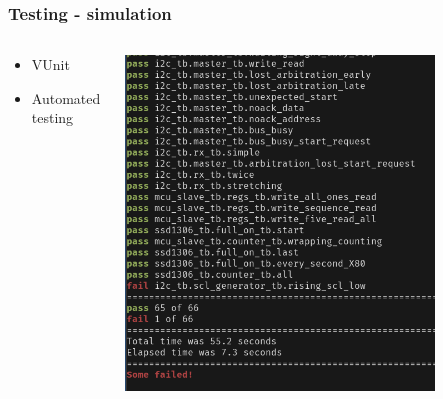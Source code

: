 \documentclass{beamer}
\begin{document}
\begin{frame}
  \frametitle{Testing - simulation}
  \begin{columns}
    \begin{column}{0.4\textwidth}
        \begin{itemize}
            \item VUnit
            \item Automated testing
        \end{itemize}
    \end{column}
    \begin{column}{0.6\textwidth}
      \includegraphics[width=0.8\textwidth]{img/vunit_run.png}
    \end{column}
  \end{columns}
\end{frame}
\end{document}
